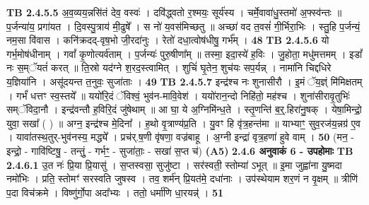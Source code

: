 \documentclass[17pt]{extarticle}
\begin{document}
                  \newline
                                \textbf{ TB 2.4.5.5} \newline
                  अ॒व॒व्यय॒न्नसि॑तं देव॒ वस्वः॑ । दवि॑द्ध्वतो र॒श्मयः॒ सूर्य॑स्य । चर्मे॒वावा॑धु॒स्तमो॑ अ॒फ्स्व॑न्तः ॥ प॒र्जन्या॑य॒ प्रगा॑यत । दि॒वस्पु॒त्राय॑ मी॒ढुषे᳚ । स नो॑ य॒वस॑मिच्छतु ॥ अच्छा॑ वद त॒वसं॑ गी॒र्भिरा॒भिः । स्तु॒हि प॒र्जन्यं॒ नम॒सा वि॑वास । कनि॑क्रदद्-वृष॒भो जी॒रदा॑नुः । रेतो॑ दधा॒त्वोष॑धीषु॒ गर्भ᳚म् । \textbf{ 48} \newline
                  \newline
                                \textbf{ TB 2.4.5.6} \newline
                  यो गर्भ॒मोष॑धीनाम् । गवां᳚ कृ॒णोत्यर्व॑ताम् । प॒र्जन्यः॑ पुरु॒षीणा᳚म् ॥ तस्मा॒ इदा॒स्ये॑ ह॒विः । जु॒होता॒ मधु॑मत्तमम् । इडां᳚ नः स॒म्ॅयतं॑ करत् ॥ ति॒स्रो यद॑ग्ने श॒रद॒स्त्वामित् । शुचिं॑ घृ॒तेन॒ शुच॑यः सप॒र्यन्न् । नामा॑नि चिद्दधिरे य॒ज्ञिया॑नि । असू॑दयन्त त॒नुवः॒ सुजा॑ताः । \textbf{ 49} \newline
                  \newline
                                \textbf{ TB 2.4.5.7} \newline
                  इन्द्र॑श्च नः शुनासीरौ । इ॒मं ॅय॒ज्ञ्ं मि॑मिक्षतम् । गर्भं॑ धत्तꣳ स्व॒स्तये᳚ ॥ ययो॑रि॒दं ॅविश्वं॒ भुव॑न-मावि॒वेश॑ । ययो॑रान॒न्दो निहि॑तो॒ मह॑श्च । शुना॑सीरावृ॒तुभिः॑ सम्ॅविदा॒नौ । इन्द्र॑वन्तौ ह॒विरि॒दं जु॑षेथाम् ॥ आ घा॒ ये अ॒ग्निमि॑न्ध॒ते । स्तृ॒णन्ति॑ ब॒र्॒.हिरा॑नु॒षक् । येषा॒मिन्द्रो॒ युवा॒ सखा᳚ ( ) ॥ अग्न॒ इन्द्र॑श्च मे॒दिना᳚ । ह॒थो वृ॒त्राण्य॑प्र॒ति । यु॒वꣳ हि वृ॑त्र॒हन्त॑मा ॥ याभ्याꣳ॒॒ सुव॒रज॑य॒न्नग्र॑ ए॒व । यावा॑तस्थ॒तुर्-भुव॑नस्य॒ मद्ध्ये᳚ । प्रच॑र्.ष॒णी वृ॑षणा॒ वज्र॑बाहू । अ॒ग्नी इन्द्रा॑ वृत्र॒हणा॑ हुवे वाम् । \textbf{ 50} \newline
                  \newline
                                    (मन॒ - इन्द्रो॒ - गावि॑ष्टिषु॒ - तन्तुं॒ - गर्भꣳ॒॒ - सुजा॑ताः॒ - सखा॑ स॒प्त च॑) \textbf{(A5)} \newline \newline
                \textbf{ 2.4.6      अनुवाकं   6 - उपहोमाः} \newline
                                \textbf{ TB 2.4.6.1} \newline
                  उ॒त नः॑ प्रि॒या प्रि॒यासु॑ । स॒प्तस्वसा॒ सुजु॑ष्टा । सर॑स्वती॒ स्तोम्या॑ ऽभूत् ॥ इ॒मा जुह्वा॑ना यु॒ष्मदा नमो॑भिः । प्रति॒ स्तोमꣳ॑ सरस्वति जुषस्व । तव॒ शर्म॑न् प्रि॒यत॑मे॒ दधा॑नाः । उप॑स्थेयाम शर॒णं न वृ॒क्षम् ॥ त्रीणि॑ प॒दा विच॑क्रमे । विष्णु॑र्गो॒पा अदा᳚भ्यः । ततो॒ धर्मा॑णि धा॒रयन्न्॑ । \textbf{ 51} \newline
\end{document}
